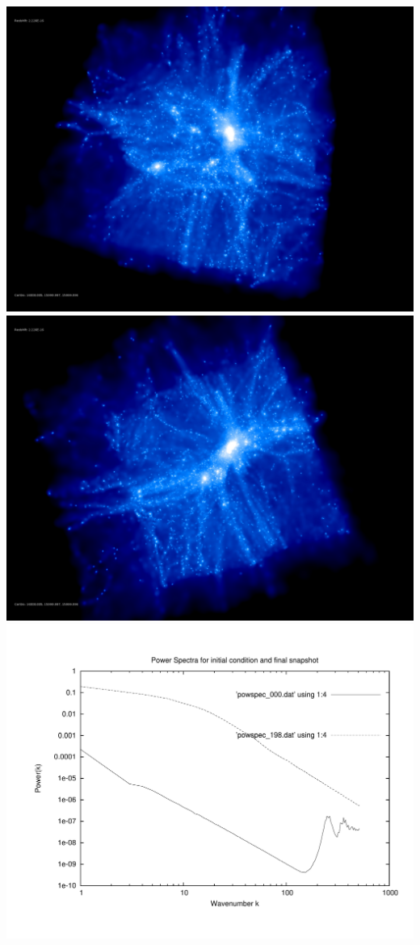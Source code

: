 \includegraphics[scale=0.1]{stages_21/rotate_00074.jpg} 
\includegraphics[scale=0.1]{stages_21/rotate_00131.jpg}  \\

\includegraphics[scale=0.5]{stages_21/plot_powspec_stages_21}

